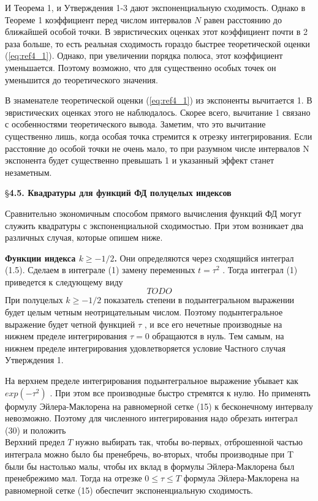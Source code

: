 И Теорема 1, и Утверждения 1-3 дают экспоненциальную сходимость. Однако в Теореме 1 коэффициент перед числом интервалов $N$ равен расстоянию до ближайшей особой точки. В эвристических оценках этот коэффициент почти в 2 раза больше, то есть реальная сходимость гораздо быстрее теоретической оценки (\ref{eq:ref4_1}). Однако, при увеличении порядка полюса, этот коэффициент уменьшается. Поэтому возможно, что для существенно особых точек он уменьшится до теоретического значения.

В знаменателе теоретической оценки (\ref{eq:ref4_1}) из экспоненты вычитается 1. В эвристических оценках этого не наблюдалось. Скорее всего, вычитание 1 связано с особенностями теоретического вывода. Заметим, что это вычитание существенно лишь, когда особая точка стремится к отрезку интегрирования. Если расстояние до особой точки не очень мало, то при разумном числе интервалов N экспонента будет существенно превышать 1 и указанный эффект станет незаметным.


\S \textbf{4.5. Квадратуры для функций ФД полуцелых индексов}

Сравнительно экономичным способом прямого вычисления функций ФД могут служить квадратуры с
экспоненциальной сходимостью. При этом возникает два различных случая,
которые опишем ниже.

\textbf{Функции индекса $k \geqslant -1/2$.} Они определяются через сходящийся
интеграл (1.5). Сделаем в интеграле (1) замену переменных $t=\tau^2$ . Тогда интеграл
(1) приведется к следующему виду
\begin{equation}
TODO
\end{equation}
При полуцелых $k \geqslant -1/2$ показатель степени в подынтегральном выражении
будет целым четным неотрицательным числом. Поэтому подынтегральное
выражение будет четной функцией $\tau$ , и все его нечетные производные на
нижнем пределе интегрирования $\tau = 0$ обращаются в нуль. Тем самым, на
нижнем пределе интегрирования удовлетворяется условие Частного случая
Утверждения 1.

На верхнем пределе интегрирования подынтегральное выражение убывает
как $exp(-\tau^2)$ . При этом все производные быстро стремятся к нулю. Но
применять формулу Эйлера-Маклорена на равномерной сетке (15) к
бесконечному интервалу невозможно. Поэтому для численного интегрирования
надо обрезать интеграл (30) и положить
\begin{equation}

\end{equation}
Верхний предел $T$ нужно выбирать так, чтобы во-первых, отброшенной частью
интеграла можно было бы пренебречь, во-вторых, чтобы производные при T
были бы настолько малы, чтобы их вклад в формулы Эйлера-Маклорена был
пренебрежимо мал. Тогда на отрезке $0 \leqslant \tau \leqslant T$ формула Эйлера-Маклорена на
равномерной сетке (15) обеспечит экспоненциальную сходимость.

